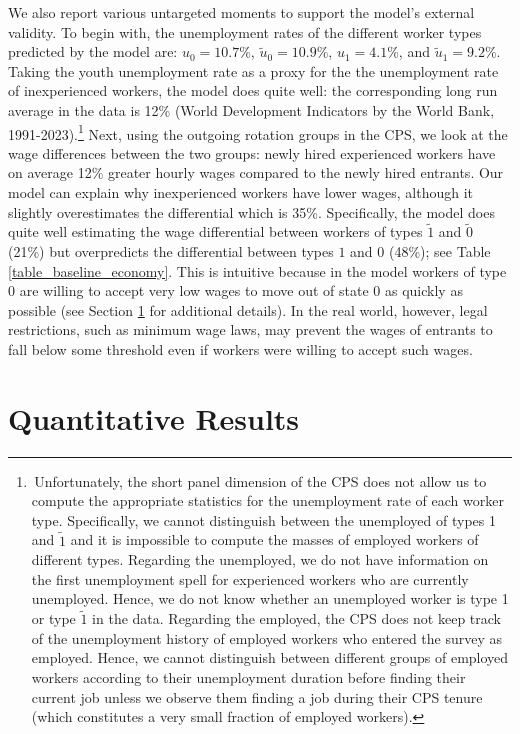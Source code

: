 \documentclass[12pt]{article} %
\theoremstyle{definition}
\begin{document}
We also report various untargeted moments to support the model's external validity.
To begin with, the unemployment rates of the different worker types predicted by the model are: $u_{0} = 10.7\%$, $\tilde{u}_{0} = 10.9\%$, $u_{1} = 4.1\%$, and $\tilde{u}_{1} = 9.2\%$.
Taking the youth unemployment rate as a proxy for the the unemployment rate of inexperienced workers, the model does quite well: the corresponding long run average in the data is 12\% (World Development Indicators by the World Bank, 1991-2023).\footnote{\,Unfortunately, the short panel dimension of the CPS does not allow us to compute the appropriate statistics for the unemployment rate of each worker type. Specifically, we cannot distinguish between the unemployed of types 1 and $\tilde{1}$ and it is impossible to compute the masses of employed workers of different types.
Regarding the unemployed, we do not have information on the first unemployment spell for experienced workers who are currently unemployed.
Hence, we do not know whether an unemployed worker is type 1 or type $\tilde{1}$ in the data.
Regarding the employed, the CPS does not keep track of the unemployment history of employed workers who entered the survey as employed.
Hence, we cannot distinguish between different groups of employed workers according to their unemployment duration before finding their current job unless we observe them finding a job during their CPS tenure (which constitutes a very small fraction of employed workers).}
Next, using the outgoing rotation groups in the CPS, we look at the wage differences between the two groups:  newly hired experienced workers have on average 12\% greater hourly wages compared to the newly hired entrants.
Our model can explain why inexperienced workers have lower wages, although it slightly overestimates the differential which is 35\%.
Specifically, the model does quite well estimating the wage differential between workers of types $\tilde{1}$ and $\tilde{0}$ (21\%) but overpredicts the differential between types $1$ and $0$ (48\%); see Table \ref{table_baseline_economy}.
This is intuitive because in the model workers of type $0$ are willing to accept very low wages to move out of state 0 as quickly as possible (see Section \ref{section results} for additional details).
In the real world, however, legal restrictions, such as minimum wage laws, may prevent the wages of entrants to fall below some threshold even if workers were willing to accept such wages.



\section{Quantitative Results}\label{section results} 
\end{document}
